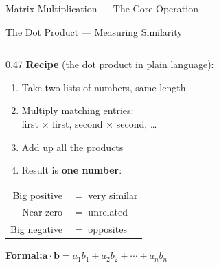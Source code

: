 \begin{frame}{Matrix Multiplication --- The Core Operation}
\end{frame}

\begin{frame}{The Dot Product --- Measuring Similarity}

  \begin{columns}[T]
    \begin{column}{0.47\textwidth}
      \textbf{Recipe} (the dot product in plain language):
      \begin{enumerate}
        \item Take two lists of numbers, same length
        \item Multiply matching entries:\\
              first $\times$ first, second $\times$ second, \ldots
        \item Add up all the products
        \item Result is \textbf{one number}:
      \end{enumerate}

      \vspace{0.3em}
      \begin{center}
        \small
        \begin{tabular}{rl}
          Big positive & $=$ very similar \\
          Near zero & $=$ unrelated \\
          Big negative & $=$ opposites
        \end{tabular}
      \end{center}

      \vspace{0.3em}
      {\footnotesize\colorbox{digitalBlue!8}{\parbox{0.9\linewidth}{%
        \textbf{Formal:}\quad $\mathbf{a} \cdot \mathbf{b}
        = a_1 b_1 + a_2 b_2 + \cdots + a_n b_n$}}}
    \end{column}


\end{columns}
\end{frame}
